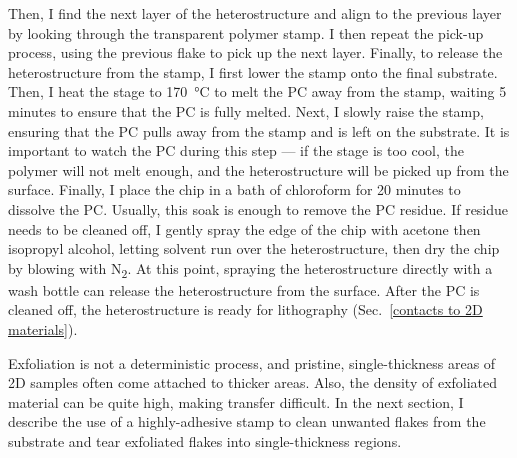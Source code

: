 \documentclass{beavtex_dub_edit}
\begin{document}
Then, I find the next layer of the heterostructure and align to the previous layer by looking through the transparent polymer stamp. I then repeat the pick-up process, using the previous flake to pick up the next layer. Finally, to release the heterostructure from the stamp, I first lower the stamp onto the final substrate. Then, I heat the stage to \SI{170}{\celsius} to melt the PC away from the stamp, waiting 5 minutes to ensure that the PC is fully melted. Next, I slowly raise the stamp, ensuring that the PC pulls away from the stamp and is left on the substrate. It is important to watch the PC during this step — if the stage is too cool, the polymer will not melt enough, and the heterostructure will be picked up from the surface. Finally, I place the chip in a bath of chloroform for 20 minutes to dissolve the PC. Usually, this soak is enough to remove the PC residue. If residue needs to be cleaned off, I gently spray the edge of the chip with acetone then isopropyl alcohol, letting solvent run over the heterostructure, then dry the chip by blowing with N\textsubscript{2}. At this point, spraying the heterostructure directly with a wash bottle can release the heterostructure from the surface. After the PC is cleaned off, the heterostructure is ready for lithography (Sec.\ \ref{contacts to 2D materials}).

Exfoliation is not a deterministic process, and pristine, single-thickness areas of 2D samples often come attached to thicker areas. Also, the density of exfoliated material can be quite high, making transfer difficult. In the next section, I describe the use of a highly-adhesive stamp to clean unwanted flakes from the substrate and tear exfoliated flakes into single-thickness regions.





\begin{center}

    \linespread{1.0}\selectfont

\end{center}
\end{document}
